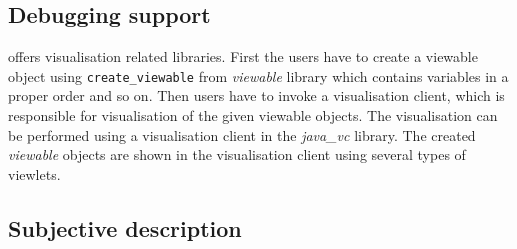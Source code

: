 \subsection{Debugging support}
\eclipse offers visualisation related libraries. First the users have to create a 
viewable object using \texttt{create\_viewable} from {\em viewable} library which 
contains variables in a proper order and so on. Then
users have to invoke a visualisation client, which is responsible for visualisation of the 
given viewable objects. The visualisation can be performed using a visualisation client
in the {\em java\_vc} library. The created {\em viewable} objects are shown in
the visualisation client using several types of viewlets.  


\subsection{Subjective description}
 